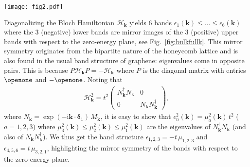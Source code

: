 \documentclass[aps,pra,showpacs,twocolumn,superscriptaddress]{revtex4-1}
\newcommand{\imag}{\mathrm{i}}
\begin{document}
\begin{figure*}[t!!!]
	\texttt{[image: fig2.pdf]}
	\caption{\label{fig:bulkfullk}  
	(a) Bulk spectrum (in units of the tunneling rate $t$) of the Bloch Hamiltonian 
	$\mathcal{H}_{\mathbf{k}}$ given by  Eq.~\eqref{Hamil} in the first Brillouin zone $BZ$ ($|k_{1,2}| \leq 1/2$). 
	Since the full spectrum is symmetric with respect to the zero-energy plane, 
	we only plot the 3 negative bands $\epsilon_1 \leq \epsilon_2 \leq \epsilon_3 \leq 0$. 
	The small black circles point out the location of Dirac points occurring between the energy bands 
	$\epsilon_3$ and $\epsilon_4$.
	 (b) Band structure of graphene. 
	 The small black circles point out the location of the 2 Dirac points of graphene.
	 Without the spin-orbit coupling term, our system is 
	 equivalent to graphene with threefold degenerate bands (i.e. one copy of the graphene 
	 band structure per spin component). 
The spin-orbit terms couple these 3 bands, 
eventually lifting their degeneracy and leading to the spectrum shown in (a). 
Due to the particular choice of the spin-orbit coupling terms $\mathcal{U}$ and $\mathcal{D}$, 
the band structure has the additional translation symmetry: 
$\epsilon_n(k_1,k_2)=\epsilon_n(k_1+1/3,k_2)=\epsilon_n(k_1,k_2+1/3)$.}
\end{figure*}


Diagonalizing the Bloch Hamiltonian $\mathcal{H}_{\mathbf{k}}$ 
yields 6 bands $\epsilon_1(\mathbf{k}) \leq \hdots \leq \epsilon_6(\mathbf{k})$ 
where the 3 (negative) lower bands are mirror images of the 3 (positive) upper bands with 
respect to the zero-energy plane, see Fig.~\ref{fig:bulkfullk}. This mirror symmetry originates 
from the bipartite nature of the honeycomb lattice and is also found in the usual band structure 
of graphene: eigenvalues come in opposite pairs. This is because 
$P\mathcal{H}_\mathbf{k}P =  -\mathcal{H}_\mathbf{k}$ where $P$ is the diagonal matrix 
with entries $\openone$ and $-\openone$. Noting that
\begin{align}
\mathcal{H}^2_{\mathbf{k}}= t^2 \left(
					\begin{matrix}
						N_{\mathbf{k}}^{\dagger}N_{\mathbf{k}} & 0\\
						0 &  N_{\mathbf{k}}N_{\mathbf{k}}^{\dagger}
					\end{matrix}
				\right),
\end{align}
where $N_{\mathbf{k}} = \exp(-\imag \mathbf{k}\cdot \bm{\delta}_1) \, M_{\mathbf{k}}$,
it is easy to show that $\epsilon^2_n(\mathbf{k}) = \mu^2_a(\mathbf{k}) \, t^2$ ($a=1,2,3$) 
where $\mu_3^2(\mathbf{k}) \leq \mu_2^2(\mathbf{k}) \leq \mu_1^2(\mathbf{k})$ 
are the eigenvalues of $N_{\mathbf{k}}^{\dagger}N_{\mathbf{k}}$ (and also of $N_{\mathbf{k}}N_{\mathbf{k}}^{\dagger}$).
We thus get the band structure $\epsilon_{1,2,3}= - t \, \mu_{1,2,3}$ and $\epsilon_{4,5,6} = t \, \mu_{3,2,1}$, 
highlighting the mirror symmetry of the bands with respect to the zero-energy plane. 
\end{document}
